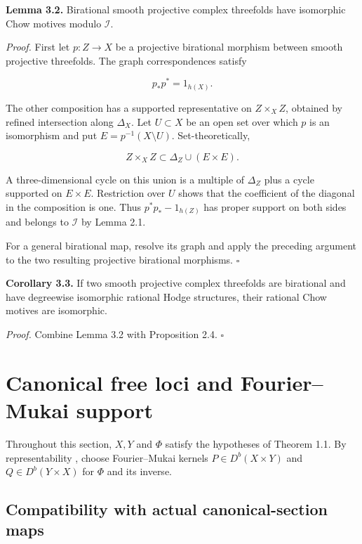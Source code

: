 \documentclass[11pt,a4paper]{article}
\begin{document}
\noindent \textbf{Lemma 3.2.} Birational smooth projective complex threefolds have isomorphic Chow motives modulo $\mathcal I$.

\noindent \emph{Proof.} First let $p:Z\to X$ be a projective birational morphism between smooth projective threefolds. The graph correspondences satisfy

\begin{equation*}
p_*p^*=1_{h(X)}.
\end{equation*}

The other composition has a supported representative on $Z\times_X Z$, obtained by refined intersection along $\Delta_X$. Let $U\subset X$ be an open set over which $p$ is an isomorphism and put $E=p^{-1}(X\setminus U)$. Set-theoretically,

\begin{equation*}
Z\times_X Z\subset\Delta_Z\cup(E\times E).
\end{equation*}

A three-dimensional cycle on this union is a multiple of $\Delta_Z$ plus a cycle supported on $E\times E$. Restriction over $U$ shows that the coefficient of the diagonal in the composition is one. Thus $p^*p_*-1_{h(Z)}$ has proper support on both sides and belongs to $\mathcal I$ by Lemma 2.1.

For a general birational map, resolve its graph and apply the preceding argument to the two resulting projective birational morphisms. $\square$

\noindent \textbf{Corollary 3.3.} If two smooth projective complex threefolds are birational and have degreewise isomorphic rational Hodge structures, their rational Chow motives are isomorphic.

\noindent \emph{Proof.} Combine Lemma 3.2 with Proposition 2.4. $\square$

\section{Canonical free loci and Fourier--Mukai support}

Throughout this section, $X,Y$ and $\Phi$ satisfy the hypotheses of Theorem 1.1. By representability \cite{Orl97}, choose Fourier--Mukai kernels $P\in D^b(X\times Y)$ and $Q\in D^b(Y\times X)$ for $\Phi$ and its inverse.

\subsection{Compatibility with actual canonical-section maps}
\end{document}
